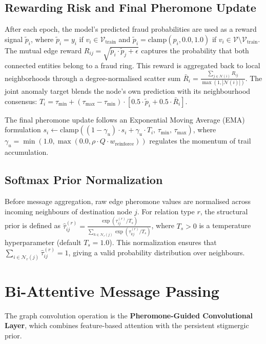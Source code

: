 \subsection{Rewarding Risk and Final Pheromone Update}
After each epoch, the model's predicted fraud probabilities are used as a reward signal $\tilde{p}_i$, where $\tilde{p}_i = y_i$ if $v_i \in \mathcal{V}_{\text{train}}$ and $\tilde{p}_i = \text{clamp}(p_i, 0.0, 1.0)$ if $v_i \in \mathcal{V} \setminus \mathcal{V}_{\text{train}}$. The mutual edge reward $R_{ij} = \sqrt{\tilde{p}_i \cdot \tilde{p}_j + \epsilon}$ captures the probability that both connected entities belong to a fraud ring. This reward is aggregated back to local neighborhoods through a degree-normalised scatter sum $\bar{R}_i = \frac{\sum_{j \in \mathcal{N}(i)} R_{ij}}{\max(1, |\mathcal{N}(i)|)}$. The joint anomaly target blends the node's own prediction with its neighbourhood consensus: $T_i = \tau_{\min} + (\tau_{\max} - \tau_{\min}) \cdot \left[0.5 \cdot \tilde{p}_i + 0.5 \cdot \bar{R}_i\right]$.

The final pheromone update follows an Exponential Moving Average (EMA) formulation $s_i \leftarrow \text{clamp}\left( (1 - \gamma_u) \cdot s_i + \gamma_u \cdot T_i, \, \tau_{\min}, \, \tau_{\max} \right)$, where $\gamma_u = \min(1.0, \max(0.0, \rho \cdot Q \cdot w_{\text{reinforce}}))$ regulates the momentum of trail accumulation.

\subsection{Softmax Prior Normalization}
Before message aggregation, raw edge pheromone values are normalised across incoming neighbours of destination node $j$. For relation type $r$, the structural prior is defined as $\hat{\tau}_{ij}^{(r)} = \frac{\exp(\tau_{ij}^{(r)} / T_s)}{\sum_{k \in \mathcal{N}_r(j)} \exp(\tau_{kj}^{(r)} / T_s)}$, where $T_s > 0$ is a temperature hyperparameter (default $T_s = 1.0$). This normalization ensures that $\sum_{i \in \mathcal{N}_r(j)} \hat{\tau}_{ij}^{(r)} = 1$, giving a valid probability distribution over neighbours.

\section[Bi-Attentive Message Passing]{Bi-Attentive Message Passing}
\label{sec:dual_attention}
\label{sec:message_passing}

The graph convolution operation is the \textbf{Pheromone-Guided Convolutional Layer}, which combines feature-based attention with the persistent stigmergic prior.

